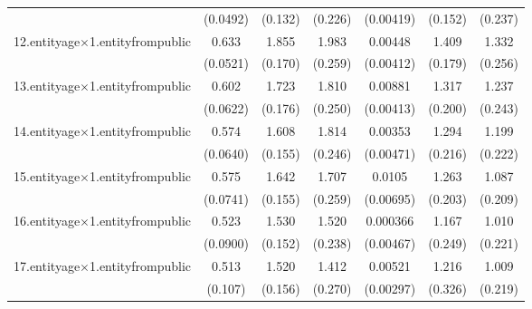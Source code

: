 {\begin{tabular}{l*{6}{c}}
            &    (0.0492)         &     (0.132)         &     (0.226)         &   (0.00419)         &     (0.152)         &     (0.237)         \\
[1em]
12.entityage$\times$1.entityfrompublic&       0.633\sym{***}&       1.855\sym{***}&       1.983\sym{***}&     0.00448         &       1.409\sym{***}&       1.332\sym{***}\\
            &    (0.0521)         &     (0.170)         &     (0.259)         &   (0.00412)         &     (0.179)         &     (0.256)         \\
[1em]
13.entityage$\times$1.entityfrompublic&       0.602\sym{***}&       1.723\sym{***}&       1.810\sym{***}&     0.00881\sym{*}  &       1.317\sym{***}&       1.237\sym{***}\\
            &    (0.0622)         &     (0.176)         &     (0.250)         &   (0.00413)         &     (0.200)         &     (0.243)         \\
[1em]
14.entityage$\times$1.entityfrompublic&       0.574\sym{***}&       1.608\sym{***}&       1.814\sym{***}&     0.00353         &       1.294\sym{***}&       1.199\sym{***}\\
            &    (0.0640)         &     (0.155)         &     (0.246)         &   (0.00471)         &     (0.216)         &     (0.222)         \\
[1em]
15.entityage$\times$1.entityfrompublic&       0.575\sym{***}&       1.642\sym{***}&       1.707\sym{***}&      0.0105         &       1.263\sym{***}&       1.087\sym{***}\\
            &    (0.0741)         &     (0.155)         &     (0.259)         &   (0.00695)         &     (0.203)         &     (0.209)         \\
[1em]
16.entityage$\times$1.entityfrompublic&       0.523\sym{***}&       1.530\sym{***}&       1.520\sym{***}&    0.000366         &       1.167\sym{***}&       1.010\sym{***}\\
            &    (0.0900)         &     (0.152)         &     (0.238)         &   (0.00467)         &     (0.249)         &     (0.221)         \\
[1em]
17.entityage$\times$1.entityfrompublic&       0.513\sym{***}&       1.520\sym{***}&       1.412\sym{***}&     0.00521         &       1.216\sym{***}&       1.009\sym{***}\\
            &     (0.107)         &     (0.156)         &     (0.270)         &   (0.00297)         &     (0.326)         &     (0.219)         \\

\end{tabular}}
